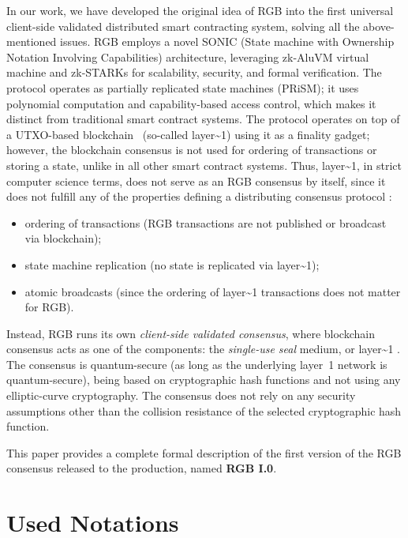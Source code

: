 \documentclass[9pt,oneside]{amsart}
\begin{document}
\begin{multicols}{2}
In our work, we have developed the original idea of RGB into the first universal
client-side validated distributed smart contracting system,
solving all the above-mentioned issues.
RGB employs a novel SONIC (State machine with Ownership Notation Involving Capabilities) architecture,
leveraging zk-AluVM virtual machine \cite{AluVM} and zk-STARKs \cite{zkSTARKs}
for scalability, security, and formal verification.
The protocol operates as partially replicated state machines (PRiSM);
it uses polynomial computation and capability-based access control,
which makes it distinct from traditional smart contract systems.
The protocol operates on top of a UTXO-based blockchain~\cite{UTXO}
(so-called \gls{layer~1}) using it as a finality gadget;
however, the blockchain consensus is not used for ordering of transactions or storing a state,
unlike in all other smart contract systems.
Thus, \gls{layer~1}, in strict computer science terms,
does not serve as an RGB consensus by itself,
since it does not fulfill any of the properties defining
a distributing consensus protocol \cite{consensus}:
\noindent\nopagebreak
\begin{itemize}
    \item ordering of transactions (RGB transactions are not published or broadcast via blockchain);
    \item state machine replication (no state is replicated via \gls{layer~1});
    \item atomic broadcasts (since the ordering of \gls{layer~1} transactions does not matter for RGB).
\end{itemize}

Instead, RGB runs its own \emph{client-side validated consensus},
where blockchain consensus acts as one of the components:
the \emph{single-use seal} medium, or \gls{layer~1} \cite{LNPBP8}.
The consensus is quantum-secure (as long as the underlying layer~1 network is quantum-secure),
being based on cryptographic hash functions and not using any elliptic-curve cryptography.
The consensus does not rely on any security assumptions other
than the collision resistance of the selected cryptographic hash function.

This paper provides a complete formal description of the first version of the RGB consensus
released to the production, named \textbf{RGB I.0}.

\section{Used Notations}


\end{multicols}
\end{document}
